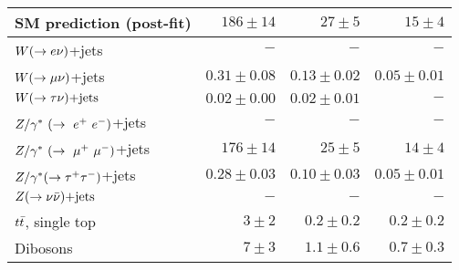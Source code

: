 \begin{table}[!ht]
\begin{center}
\begin{small}
\begin{tabular*}{\textwidth}{@{\extracolsep{\fill}}lrrr}
    SM prediction (post-fit)                     & $186 \pm 14$   & $27 \pm 5$     &  $15 \pm 4$     \\ \hline
                                                                                           
    $W(\rightarrow e \nu)$+jets                             & $-$           & $-$           &  $-$           \\
                                                                                           
    $W(\rightarrow \mu \nu)$+jets                             & $0.31 \pm 0.08$& $0.13 \pm 0.02$&  $0.05 \pm 0.01$\\
                                                                                           
    $W(\rightarrow \tau \nu)\text{+jets}$                             & $0.02 \pm 0.00$& $0.02 \pm 0.01$&  $-$           \\
                                                                                           
    $Z/\gamma^*~(\rightarrow~e^+~e^-)$+jets                             & $-$           & $-$           &  $-$           \\
                                                                                           
    $Z/\gamma^*~(\rightarrow~\mu^+~\mu^-)$+jets                             & $176 \pm 14$   & $25 \pm 5$     &  $14 \pm 4$     \\
                                                                                           
    $Z/\gamma^*(\rightarrow \tau^+ \tau^-)$+jets                             & $0.28 \pm 0.03$& $0.10 \pm 0.03$&  $0.05 \pm 0.01$\\
                                                                                           
    $Z(\rightarrow \nu \bar{\nu})\text{+jets}$                             & $-$           & $-$           &  $-$           \\
                                                                                           
    $t\bar{t}$, single top               & $3 \pm 2$      & $0.2 \pm 0.2$  &  $0.2 \pm 0.2$  \\
                                                                                           
    Dibosons                           & $7 \pm 3$      & $1.1 \pm 0.6$  &  $0.7 \pm 0.3$  \\


\end{tabular*}
\end{small}
\end{center}
\end{table}
